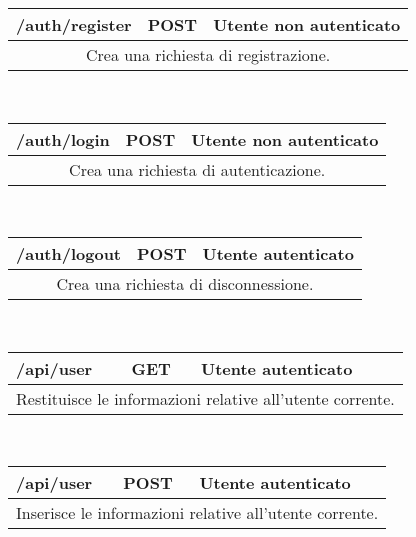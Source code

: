 \begin{table}[h]
	\begin{tabular}{|p{}|p{}|p{}|}
		\toprule
		\textbf{/auth/register} & \textbf{POST} & \textbf{Utente non autenticato} \\ \midrule
		\multicolumn{3}{|c|}{Crea una richiesta di registrazione.} \\
		\bottomrule
	\end{tabular}\\
	\par\bigskip
	
	\begin{tabular}{|p{}|p{}|p{}|}
		\toprule
		\textbf{/auth/login} & \textbf{POST} & \textbf{Utente non autenticato} \\ \midrule
		\multicolumn{3}{|c|}{Crea una richiesta di autenticazione.} \\
		\bottomrule
	\end{tabular}\\
	\par\bigskip
	
	\begin{tabular}{|p{}|p{}|p{}|}
		\toprule
		\textbf{/auth/logout} & \textbf{POST} & \textbf{Utente autenticato} \\ \midrule
		\multicolumn{3}{|c|}{Crea una richiesta di disconnessione.} \\
		\bottomrule
	\end{tabular}\\
	\par\bigskip
	
	\begin{tabular}{|p{}|p{}|p{}|}
		\toprule
		\textbf{/api/user} & \textbf{GET} & \textbf{Utente autenticato} \\ \midrule
		\multicolumn{3}{|c|}{Restituisce le informazioni relative all'utente corrente.} \\
		\bottomrule
	\end{tabular}\\
	\par\bigskip
	
	\begin{tabular}{|p{}|p{}|p{}|}
		\toprule
		\textbf{/api/user} & \textbf{POST} & \textbf{Utente autenticato} \\ \midrule
		\multicolumn{3}{|c|}{Inserisce le informazioni relative all'utente corrente.} \\
		\bottomrule
	\end{tabular}\\
	\par\bigskip
	

\end{table}
